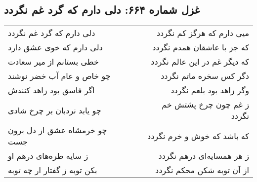 \begin{center}
\section*{غزل شماره ۶۶۴: دلی دارم که گرد غم نگردد}
\label{sec:0664}
\begin{longtable}{l p{0.5cm} r}
دلی دارم که گرد غم نگردد
&&
میی دارم که هرگز کم نگردد
\\
دلی دارم که خوی عشق دارد
&&
که جز با عاشقان همدم نگردد
\\
خطی بستانم از میر سعادت
&&
که دیگر غم در این عالم نگردد
\\
چو خاص و عام آب خضر نوشند
&&
دگر کس سخره ماتم نگردد
\\
اگر فاسق بود زاهد کنندش
&&
وگر زاهد بود بلعم نگردد
\\
چو یابد نردبان بر چرخ شادی
&&
ز غم چون چرخ پشتش خم نگردد
\\
چو خرمشاه عشق از دل برون جست
&&
که باشد که خوش و خرم نگردد
\\
ز سایه طره‌های درهم او
&&
ز هر همسایه‌ای درهم نگردد
\\
بکن توبه ز گفتار ار چه توبه
&&
از آن توبه شکن محکم نگردد
\\
\end{longtable}
\end{center}
